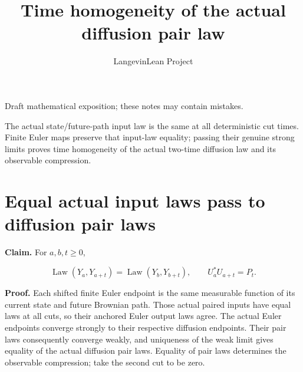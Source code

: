\documentclass[11pt,a4paper]{article}
\title{\texorpdfstring{Time homogeneity of the actual diffusion pair law}{Time homogeneity of the actual diffusion pair law}}
\author{LangevinLean Project}
\date{}
\begin{document}
\maketitle
Draft mathematical exposition; these notes may contain mistakes.


The actual state/\allowbreak{}future-path input law is the same at all deterministic cut times. Finite Euler maps preserve that input-law equality; passing their genuine strong limits proves time homogeneity of the actual two-time diffusion law and its observable compression.


\section{\texorpdfstring{Equal actual input laws pass to diffusion pair laws}{Equal actual input laws pass to diffusion pair laws}}


\textbf{Claim.} For \(a,b,t\ge0\),

\[\operatorname{Law}(Y_a,Y_{a+t})=\operatorname{Law}(Y_b,Y_{b+t}),\qquad U_a^*U_{a+t}=P_t.\]

\textbf{Proof.} Each shifted finite Euler endpoint is the same measurable function of its current state and future Brownian path. Those actual paired inputs have equal laws at all cuts, so their anchored Euler output laws agree. The actual Euler endpoints converge strongly to their respective diffusion endpoints. Their pair laws consequently converge weakly, and uniqueness of the weak limit gives equality of the actual diffusion pair laws. Equality of pair laws determines the observable compression; take the second cut to be zero.
\end{document}
